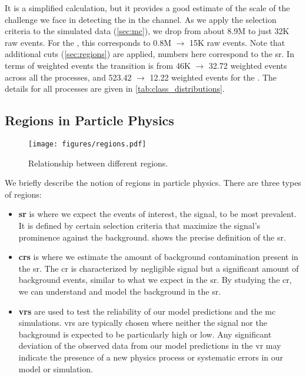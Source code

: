 It is a simplified calculation, but it provides a good estimate of the scale of the challenge we face in detecting the
\tth in the \lss channel. As we apply the selection criteria to the simulated data (\autoref{sec:mc}), we drop from
about 8.9M to just 32K raw events. For the \tth, this corresponds to 0.8M $\rightarrow$ 15K raw events. Note that
additional cuts (\autoref{sec:regions}) are applied, numbers here correspond to the \acrshort{sr}. In terms of
weighted events the transition is from 46K $\rightarrow$ 32.72 weighted events across all the processes, and 523.42
$\rightarrow$ 12.22 weighted events for the \tth. The details for all processes are given in \autoref{tab:class_distributions}.


\subsection{Regions in Particle Physics}
\label{sec:regions}

\begin{figure}[htbp]
    \centering
    \texttt{[image: figures/regions.pdf]}
    \caption{Relationship between different regions.}
    \label{fig:regions}
\end{figure}

We briefly describe the notion of regions in particle physics. There are three types of regions:

\begin{itemize}
    \item \textbf{\gls{sr}} is where we expect the events of interest, the
          signal, to be most prevalent. It is defined by certain selection criteria that maximize the signal's prominence against
          the background.  shows the precise definition of the \gls{sr}.

    \item \textbf{\glspl{cr}} is where we estimate the amount of background contamination
          present in the \gls{sr}. The \gls{cr} is characterized by negligible signal but a significant amount of background
          events, similar to what we expect in the \gls{sr}. By studying the \gls{cr}, we can understand and model the background in the \gls{sr}.

    \item \textbf{\glspl{vr}} are used to test the reliability of our model predictions and the \gls{mc} simulations.
          \glspl{vr} are typically chosen where neither the signal nor the background is expected to be particularly high or
          low. Any significant deviation of the observed data from our model predictions in the \gls{vr} may indicate the
          presence of a new physics process or systematic errors in our model or simulation.
\end{itemize}

